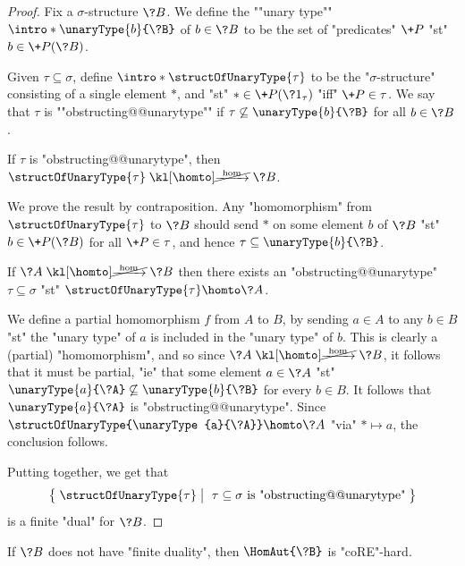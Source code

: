 \begin{proof}
	Fix a $\sigma$-structure $\?B$. We define the \AP""unary type""
	$\intro*\unaryType{b}{\?B}$ of $b \in \?B$
	to be the set of "predicates" $\+P$ "st" $b \in \+P(\?B)$.
	
	Given $\tau \subseteq \sigma$, define \AP$\intro*\structOfUnaryType{\tau}$
	to be the "$\sigma$-structure"
	consisting of a single element $*$, and "st" $* \in \+P(\?1_\tau)$ "iff"
	$\+P \in \tau$.
	We say that $\tau$ is \AP""obstructing@@unarytype"" if
	$\tau \not\subseteq \unaryType{b}{\?B}$ for all $b \in \?B$.

	\begin{claim}
		\AP\label{claim:finite-duality-unary-predicates-direct}
		If $\tau$ is "obstructing@@unarytype",
		then $\structOfUnaryType{\tau} \nothomto \?B$.
	\end{claim}
	We prove the result by contraposition.
	Any "homomorphism" from $\structOfUnaryType{\tau}$ to $\?B$
	should send $*$ on some element $b$ of $\?B$
	"st" $b \in \+P(\?B)$ for all $\+P \in \tau$, and
	hence $\tau \subseteq \unaryType{b}{\?B}$.

	\begin{claim}
		\AP\label{claim:finite-duality-unary-predicates-converse}
		If $\?A \nothomto \?B$ then there exists an "obstructing@@unarytype"
		$\tau \subseteq \sigma$ "st" $\structOfUnaryType{\tau} \homto \?A$.
	\end{claim}
	We define a partial homomorphism $f$ from $A$ to $B$,
	by sending $a \in A$ to any $b \in B$ "st" the "unary type" of $a$
	is included in the "unary type" of $b$. This is clearly a (partial) "homomorphism",
	and so since $\?A \nothomto \?B$, it follows that it must be partial,
	"ie" that some element $a \in \?A$ "st" $\unaryType{a}{\?A} \not\subseteq
	\unaryType{b}{\?B}$ for every $b \in B$. It follows that $\unaryType{a}{\?A}$
	is "obstructing@@unarytype". Since $\structOfUnaryType{\unaryType{a}{\?A}} \homto \?A$
	"via" $* \mapsto a$, the conclusion follows.

	Putting  together, we get that
	\[
		\big\{\;
			\structOfUnaryType{\tau}
			\;\big\vert\;
			\text{ $\tau \subseteq \sigma$ is "obstructing@@unarytype"} 
		\;\big\}
	\]
	is a finite "dual" for $\?B$.
\end{proof}

\begin{corollary}
	\!%
	\AP\label{coro:lowerbound-hom}
	If $\?B$ does not have "finite duality", then $\HomAut{\?B}$
	is "coRE"-hard.
\end{corollary}

